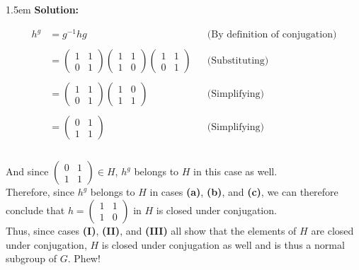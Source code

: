 \documentclass{article}
\newenvironment{solution}{
	\vspace{.5em}
	\par
	\begin{adjustwidth}{1.5em}{}
	\textbf{{Solution:}}
	\par
	\vspace{.5em}
}{
	\vspace{1em}
	\end{adjustwidth}
	\setcounter{step}{0}
}
\newcounter{step}
\begin{document}
\begin{solution}
	\begin{align*}
		h^{g} &= g^{-1}hg  &&\text{(By definition of conjugation)} \\\\
		&= \begin{pmatrix}
			1 & 1 \\
			0 & 1
		\end{pmatrix}
		\begin{pmatrix}
			1 & 1 \\
			1 & 0
		\end{pmatrix}
		\begin{pmatrix}
			1 & 1 \\
			0 & 1
		\end{pmatrix}
		&&\text{(Substituting)} \\\\
		&= \begin{pmatrix}
			1 & 1 \\
			0 & 1
		\end{pmatrix}
		\begin{pmatrix}
			1 & 0 \\
			1 & 1
		\end{pmatrix}
		&&\text{(Simplifying)} \\\\
		&= \begin{pmatrix}
			0 & 1 \\
			1 & 1
		\end{pmatrix}
		&&\text{(Simplifying)} \\\\
	\end{align*}

	And since $\begin{pmatrix} 0 & 1 \\ 1 & 1 \end{pmatrix} \in H$, $h^{g}$ belongs to $H$ in this case as well. \\

	Therefore, since $h^{g}$ belongs to $H$ in cases \textbf{(a)}, \textbf{(b)}, and \textbf{(c)}, we can therefore conclude that $h = \begin{pmatrix} 1 & 1 \\ 1 & 0 \end{pmatrix}$ in $H$ is closed under conjugation. \\

	Thus, since cases \textbf{(I)}, \textbf{(II)}, and \textbf{(III)} all show that the elements of $H$ are closed under conjugation, $H$ is closed under conjugation as well and is thus a normal subgroup of $G$. Phew!
\end{solution}
\end{document}
